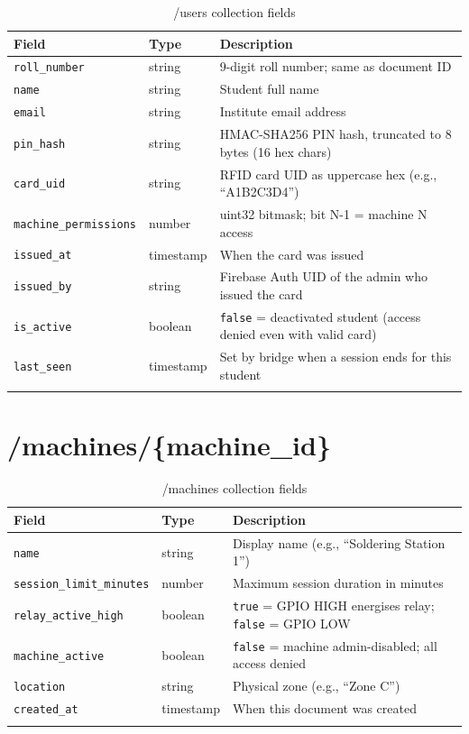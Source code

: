 \begin{longtable}{L{4cm}L{2.5cm}L{8cm}}
\toprule
\textbf{Field} & \textbf{Type} & \textbf{Description} \\
\midrule
\endhead
\texttt{roll\_number} & string & 9-digit roll number; same as document ID \\
\texttt{name} & string & Student full name \\
\texttt{email} & string & Institute email address \\
\texttt{pin\_hash} & string & HMAC-SHA256 PIN hash, truncated to 8 bytes (16 hex chars) \\
\texttt{card\_uid} & string & RFID card UID as uppercase hex (e.g., ``A1B2C3D4'') \\
\texttt{machine\_permissions} & number & uint32 bitmask; bit N-1 = machine N access \\
\texttt{issued\_at} & timestamp & When the card was issued \\
\texttt{issued\_by} & string & Firebase Auth UID of the admin who issued the card \\
\texttt{is\_active} & boolean & \texttt{false} = deactivated student (access denied even with valid card) \\
\texttt{last\_seen} & timestamp & Set by bridge when a session ends for this student \\
\bottomrule
\caption{/users collection fields}
\end{longtable}

\section{/machines/\{machine\_id\}}

\begin{longtable}{L{4.5cm}L{2.5cm}L{7.5cm}}
\toprule
\textbf{Field} & \textbf{Type} & \textbf{Description} \\
\midrule
\endhead
\texttt{name} & string & Display name (e.g., ``Soldering Station 1'') \\
\texttt{session\_limit\_minutes} & number & Maximum session duration in minutes \\
\texttt{relay\_active\_high} & boolean & \texttt{true} = GPIO HIGH energises relay; \texttt{false} = GPIO LOW \\
\texttt{machine\_active} & boolean & \texttt{false} = machine admin-disabled; all access denied \\
\texttt{location} & string & Physical zone (e.g., ``Zone C'') \\
\texttt{created\_at} & timestamp & When this document was created \\
\bottomrule
\caption{/machines collection fields}
\end{longtable}

